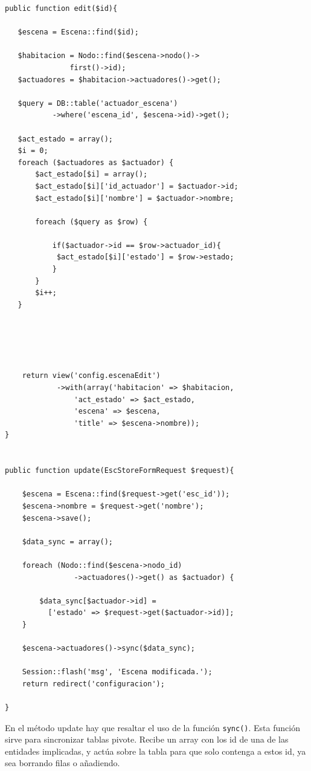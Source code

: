    \begin{lstlisting}
public function edit($id){

   $escena = Escena::find($id);
   
   $habitacion = Nodo::find($escena->nodo()->
               first()->id);
   $actuadores = $habitacion->actuadores()->get();
   
   $query = DB::table('actuador_escena')
           ->where('escena_id', $escena->id)->get();
           
   $act_estado = array();
   $i = 0;
   foreach ($actuadores as $actuador) {
       $act_estado[$i] = array();
       $act_estado[$i]['id_actuador'] = $actuador->id;
       $act_estado[$i]['nombre'] = $actuador->nombre;
   
       foreach ($query as $row) {
   
           if($actuador->id == $row->actuador_id){
            $act_estado[$i]['estado'] = $row->estado;
           }
       }
       $i++;
   }





    return view('config.escenaEdit')
            ->with(array('habitacion' => $habitacion,
                'act_estado' => $act_estado,
                'escena' => $escena,
                'title' => $escena->nombre));
}


public function update(EscStoreFormRequest $request){

    $escena = Escena::find($request->get('esc_id'));
    $escena->nombre = $request->get('nombre');
    $escena->save();
    
    $data_sync = array();
    
    foreach (Nodo::find($escena->nodo_id)
                ->actuadores()->get() as $actuador) {
                
        $data_sync[$actuador->id] = 
          ['estado' => $request->get($actuador->id)];
    }
    
    $escena->actuadores()->sync($data_sync);
    
    Session::flash('msg', 'Escena modificada.');
    return redirect('configuracion');

}
\end{lstlisting}

En el método update hay que resaltar el uso de la función \lstinline|sync()|. Esta función sirve para sincronizar tablas pivote. Recibe un array con los id de una de las entidades implicadas, y actúa sobre la tabla para que solo contenga a estos id, ya sea borrando filas o añadiendo.


